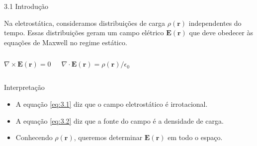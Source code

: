 \documentclass[aspectratio=169,11pt]{beamer}
\newcommand{\E}{\mathbf{E}}
\newcommand{\rr}{\mathbf{r}}
\begin{document}
\begin{frame}{3.1 Introdução}
\begin{mybox}
\justifying
Na eletrostática, consideramos distribuições de carga \(\rho(\rr)\) independentes do tempo. 
Essas distribuições geram um campo elétrico \(\E(\rr)\) que deve obedecer às equações de Maxwell no regime estático.
\end{mybox}

\vspace{0.2cm}

\begin{columns}[T,onlytextwidth]
\begin{eqbox}
\begin{equation}
\nabla\times \E(\rr)=0
\label{eq:3.1}
\end{equation}
\end{eqbox}

\begin{eqbox}
\begin{equation}
 \nabla\cdot \E(\rr)=\rho(\rr)/\epsilon_0
\label{eq:3.2}
\end{equation}
\end{eqbox}
\end{columns}

\vspace{0.2cm}

\begin{block}{Interpretação}
\begin{itemize}
    \item A equação \eqref{eq:3.1} diz que o campo eletrostático é \alert{irrotacional}.
    \item A equação \eqref{eq:3.2} diz que a \alert{fonte} do campo é a densidade de carga.
    \item Conhecendo \(\rho(\rr)\), queremos determinar \(\E(\rr)\) em todo o espaço.
\end{itemize}
\end{block}
\end{frame}
\end{document}
